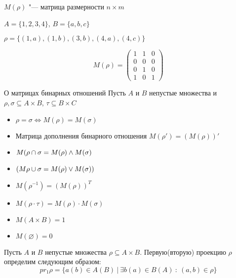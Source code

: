 $M(\rho)$ "--- матрица размерности $n \times m$

\begin{example}
    $A = \{1, 2, 3, 4\}$, $B = \{a, b, c\}$

    $\rho = \{(1, a), (1, b), (3, b), (4, a), (4, c)\}$
\end{example}


\begin{equation*}
    M(\rho) = \left( \begin{matrix}
        1 & 1 & 0 \\
        0 & 0 & 0 \\
        0 & 1 & 0 \\
        1 & 0 & 1 
    \end{matrix} \right)
\end{equation*}

\begin{theorem}{О матрицах бинарных отношений}
    Пусть $A$ и $B$ непустые множества и $\rho, \sigma \subseteq A \times B$,
    $\tau \subseteq B \times C$
    \begin{itemize}
        \item $\rho = \sigma \Leftrightarrow M(\rho) = M(\sigma)$
        \item Матрица дополнения бинарного отношения $M(\rho')
        = (M(\rho))'$
        \item $M(\rho \cap \sigma = M(\rho) \wedge M(\sigma)$
        \item $(M\rho \cup \sigma = M(\rho) \vee M(\sigma))$
        \item $M(\rho^{-1}) = (M(\rho))^T$
        \item $M(\rho \cdot \tau) = M(\rho) \cdot M(\sigma)$
        \item $M(A \times B) = 1$
        \item $M(\varnothing) = 0$
    \end{itemize}

\end{theorem}

\begin{definition}
    Пусть $A$ и $B$ непустые множества $\rho \subseteq A \times B$.
    Первую(вторую) проекцию $\rho$ определим следующим образом:
    \begin{equation*}
        {pr_1}\rho =
         \{a(b) \in A(B) ~|~ \exists b(a) \in B(A) ~:~ (a, b) \in \rho\}
    \end{equation*}
\end{definition}

